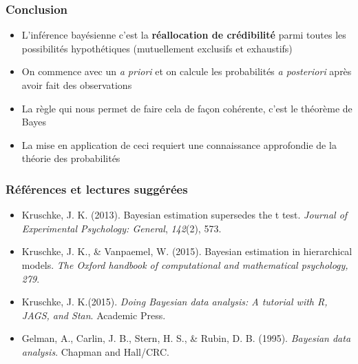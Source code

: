 \documentclass{beamer}
\begin{document}
\begin{frame}
    \frametitle{Conclusion}
    \begin{itemize}
      \item L'inférence bayésienne c'est la \textbf{réallocation de crédibilité}
            parmi toutes les possibilités hypothétiques (mutuellement exclusifs et exhaustifs)
      \pause
      \item On commence avec un \emph{a priori} et on calcule les probabilités
            \emph{a posteriori} après avoir fait des observations
      \pause
      \item La règle qui nous permet de faire cela de façon cohérente, c'est le théorème de Bayes
      \pause
      \item La mise en application de ceci requiert une connaissance approfondie de la théorie des probabilités
    \end{itemize}
\end{frame}


\begin{frame}
    \frametitle{Références et lectures suggérées}
    \begin{itemize}
      \item Kruschke, J. K. (2013). Bayesian estimation supersedes the t test.
            \emph{Journal of Experimental Psychology: General}, \emph{142}(2), 573.
      \item Kruschke, J. K., \& Vanpaemel, W. (2015). Bayesian estimation in hierarchical models.
            \emph{The Oxford handbook of computational and mathematical psychology, 279}.
      \item Kruschke, J. K.(2015). \emph{Doing Bayesian data analysis: A tutorial with R, JAGS, and Stan}.
            Academic Press.
      \item Gelman, A., Carlin, J. B., Stern, H. S., \& Rubin, D. B. (1995).
            \emph{Bayesian data analysis}. Chapman and Hall/CRC.
    \end{itemize}
\end{frame}


\end{document}
